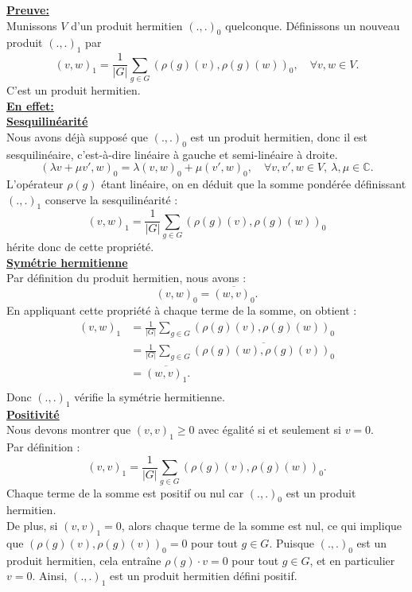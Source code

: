 \documentclass[a4paper, 14pt]{report}
\begin{document}
\begin{onehalfspace}
{\textbf{\underline{Preuve:}}  \\
Munissons \( V \) d’un produit hermitien \( (.,.)_0 \) quelconque. Définissons un nouveau produit  \( (.,.)_1 \)  par  
\[
(v, w)_1 = \frac{1}{|G|} \sum_{g \in G} (\rho(g) (v), \rho(g) (w))_0, \quad \forall v, w \in V.
\]
C'est un produit hermitien.\\
\textbf{\underline{En effet:}}\\ 
\textbf{\underline{Sesquilinéarité}}\\   
Nous avons déjà supposé que \( (.,.)_0 \) est un produit hermitien, donc il est sesquilinéaire, c'est-à-dire linéaire à gauche et semi-linéaire à droite. 
\[
(\lambda v + \mu v', w)_0 = \lambda (v, w)_0 + \mu (v', w)_0, \quad \forall v, v', w \in V, \ \lambda, \mu \in \mathbb{C}.
\]
L'opérateur \( \rho(g) \) étant linéaire, on en déduit que la somme pondérée définissant \( (.,.)_1 \) conserve la sesquilinéarité :  
\[
(v, w)_1 = \frac{1}{|G|} \sum_{g \in G} (\rho(g) (v), \rho(g) (w))_0
\]
hérite donc de cette propriété.\\
\textbf{\underline{Symétrie hermitienne}}\\  
Par définition du produit hermitien, nous avons :  
\[
(v, w)_0 = \overline{(w, v)_0}.
\]
En appliquant cette propriété à chaque terme de la somme, on obtient :
\begin{align*}
	(v, w)_1 
	&= \frac{1}{|G|} \sum_{g \in G} (\rho(g) (v), \rho(g) (w))_0 \\
	&= \frac{1}{|G|} \sum_{g \in G} \overline{(\rho(g) (w), \rho(g) (v))_0} \\
	&= \overline{(w, v)_1}. \\
\end{align*}
Donc \( (.,.)_1 \) vérifie la symétrie hermitienne.\\
\textbf{\underline{Positivité }}\\  
Nous devons montrer que \( (v, v)_1 \geq 0 \) avec égalité si et seulement si \( v = 0 \).\\
Par définition :
\[
(v, v)_1 = \frac{1}{|G|} \sum_{g \in G} (\rho(g) (v), \rho(g) (w))_0.
\]
Chaque terme de la somme est positif ou nul car \( (.,.)_0 \) est un produit hermitien.\\
De plus, si \( (v, v)_1 = 0 \), alors chaque terme de la somme est nul, ce qui implique que \( (\rho(g) (v), \rho(g) (v))_0 = 0 \) pour tout \( g \in G\). Puisque \( (.,.)_0 \) est un produit hermitien, cela entraîne \( \rho(g) \cdot v = 0 \) pour tout \( g \in G\), et en particulier \( v = 0 \). Ainsi, \( (.,.)_1 \) est un produit hermitien défini positif.\\
}
\end{onehalfspace}
\end{document}
